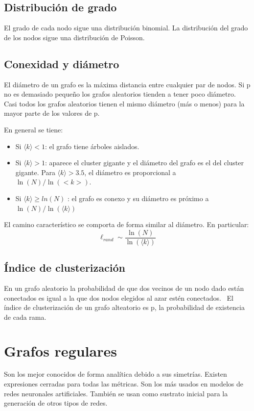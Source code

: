 \subsection{Distribución de grado}
El grado de cada nodo sigue una distribución binomial. La distribución del grado de los nodos sigue una distribución de Poisson. 

\subsection{Conexidad y diámetro}
El diámetro de un grafo es la máxima distancia entre cualquier par de nodos. Si p no es demasiado pequeño los grafos aleatorios tienden a tener poco diámetro. Casi todos los grafos aleatorios tienen el mismo diámetro (más o menos) para la mayor parte de los valores de p.

En general se tiene:
\begin{itemize}
\item Si $\langle k \rangle < 1$: el grafo tiene árboles aislados.
\item Si $\langle k \rangle > 1$: aparece el cluster gigante y el diámetro del grafo es el del cluster gigante. Para $\langle k \rangle > 3.5$, el diámetro es proporcional a $\ln(N)/\ln(<k>)$.
\item Si $\langle k \rangle \geq ln(N)$ : el grafo es conexo y su diámetro es próximo a $\ln(N)/\ln(\langle k \rangle)$
\end{itemize}

El camino característico se comporta de forma similar al diámetro. En particular:
 $$\ell_{rand} \sim \frac{\ln(N)}{\ln(\langle k \rangle)}$$
 
\subsection{Índice de clusterización}
En un grafo aleatorio la probabilidad de que dos vecinos de un nodo dado están conectados es igual a la que dos nodos elegidos al azar estén conectados.
 \
El índice de clusterización de un grafo alteatorio es p, la probabilidad de existencia de cada rama.

\section{Grafos regulares}
Son los mejor conocidos de forma analítica debido a sus simetrías. Existen expresiones cerradas para todas las métricas. Son los más usados en modelos de redes neuronales artificiales. También se usan como sustrato inicial para la generación de otros tipos de redes.

